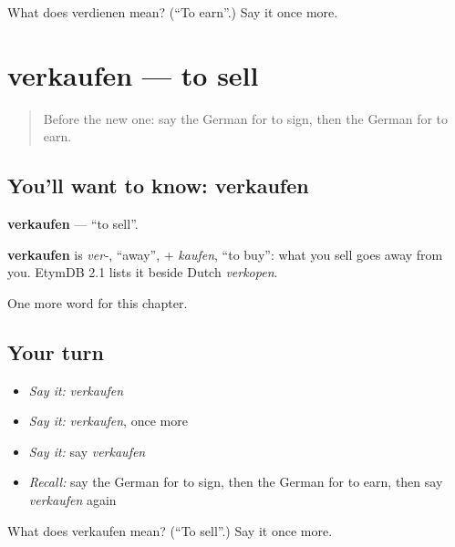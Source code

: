 \begin{tcolorbox}[breakable,colback=teal!4,colframe=teal!35!black,title={Before you move on}]
What does verdienen mean? (\textquotedblleft{}To earn\textquotedblright{}.) Say it once more.
\end{tcolorbox}
\section[verkaufen]{verkaufen — to sell}

\label{lesson:GE-C152-verkaufen}



\begin{quote}
Before the new one: say the German for to sign, then the German for to earn.
\end{quote}

\subsection*{You'll want to know: verkaufen}
\textbf{verkaufen} — \textquotedblleft{}to sell\textquotedblright{}.

\begin{cousinweb}
\textbf{verkaufen} is \emph{ver-}, \textquotedblleft{}away\textquotedblright{}, + \emph{kaufen}, \textquotedblleft{}to buy\textquotedblright{}: what you sell goes away from you. EtymDB 2.1 lists it beside Dutch \emph{verkopen}.
\end{cousinweb}

\begin{grammarlens}[title={What you've built}]
One more word for this chapter.
\end{grammarlens}

\subsection*{Your turn}
\begin{itemize}
\raggedright
  \item \emph{Say it:} \emph{verkaufen}
  \item \emph{Say it:} \emph{verkaufen}, once more
  \item \emph{Say it:} say \emph{verkaufen}
  \item \emph{Recall:} say the German for to sign, then the German for to earn, then say \emph{verkaufen} again
\end{itemize}

\begin{tcolorbox}[breakable,colback=teal!4,colframe=teal!35!black,title={Before you move on}]
What does verkaufen mean? (\textquotedblleft{}To sell\textquotedblright{}.) Say it once more.
\end{tcolorbox}
